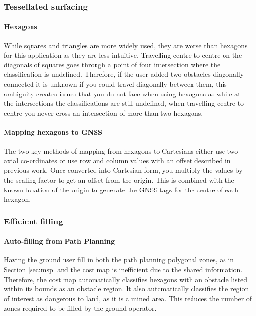 \subsubsection{Tessellated surfacing}\label{sub_sub_section:tgt_hexagons}
\paragraph{Hexagons} While squares and triangles are more widely used, they are worse than hexagons for this application as they are less intuitive. Travelling centre to centre on the diagonals of squares goes through a point of four intersection where the classification is undefined. Therefore, if the user added two obstacles diagonally connected it is unknown if you could travel diagonally between them, this ambiguity creates issues that you do not face when using hexagons as while at the intersections the classifications are still undefined, when travelling centre to centre you never cross an intersection of more than two hexagons.
\paragraph{Mapping hexagons to \gls{GNSS}} \label{para:Mapping hexagons}
The two key methods of mapping from hexagons to Cartesians either use two axial co-ordinates or use row and column values with an offset described in previous work\cite{MappingHexagons}. Once converted into Cartesian form, you multiply the values by the scaling factor to get an offset from the origin. This is combined with the known location of the origin to generate the \gls{GNSS} tags for the centre of each hexagon.

\subsubsection{Efficient filling}\label{sub_sub_section:tgt_filling}
\paragraph{Auto-filling from Path Planning}
Having the ground user fill in both the path planning polygonal zones, as in Section \ref{sec:msp} and the cost map is inefficient due to the shared information. Therefore, the cost map automatically classifies hexagons with an obstacle listed within its bounds as an obstacle region. It also automatically classifies the region of interest as dangerous to land, as it is a mined area. This reduces the number of zones required to be filled by the ground operator. 
